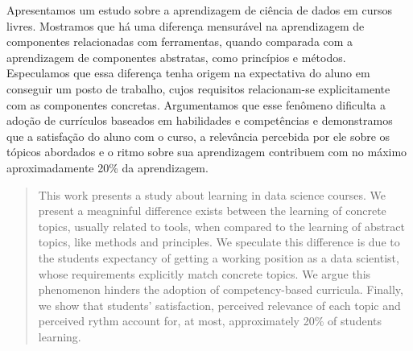 \begin{resumo}
Apresentamos um estudo sobre a aprendizagem de ciência de dados em cursos livres.
Mostramos que há uma diferença mensurável na aprendizagem de componentes relacionadas com ferramentas, quando comparada com a aprendizagem de componentes abstratas, como princípios e métodos.
Especulamos que essa diferença tenha origem na expectativa do aluno em conseguir um posto de trabalho, cujos requisitos relacionam-se explicitamente com as componentes concretas.
Argumentamos que esse fenômeno dificulta a adoção de currículos baseados em habilidades e competências e demonstramos que a satisfação do aluno com o curso, a relevância percebida por ele sobre os tópicos abordados e o ritmo sobre sua aprendizagem contribuem com no máximo aproximadamente 20\% da aprendizagem.
\end{resumo}

\begin{abstract}
This work presents a study about learning in data science courses.
We present a meagninful difference exists between the learning of concrete topics, usually related to tools, when compared to the learning of abstract topics, like methods and principles.
We speculate this difference is due to the students expectancy of getting a working position as a data scientist, whose requirements explicitly match concrete topics.
We argue this phenomenon hinders the adoption of competency-based curricula.
Finally, we show that students' satisfaction, perceived relevance of each topic and perceived rythm account for, at most, approximately 20\% of students learning.
\end{abstract}
